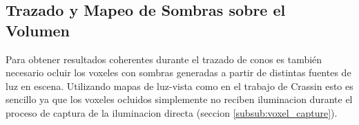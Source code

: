 \subsection{Trazado y Mapeo de Sombras sobre el Volumen} %
\label{sub:trazado_de_sombras_sobre_el_volumen}

Para obtener resultados coherentes durante el trazado de conos es también necesario ocluir los voxeles con sombras generadas a partir de distintas fuentes de luz en escena. Utilizando mapas de luz-vista como en el trabajo de Crassin esto es sencillo ya que los voxeles ocluidos simplemente no reciben iluminacion durante el proceso de captura de la iluminacion directa (seccion \ref{subsub:voxel_capture}).

